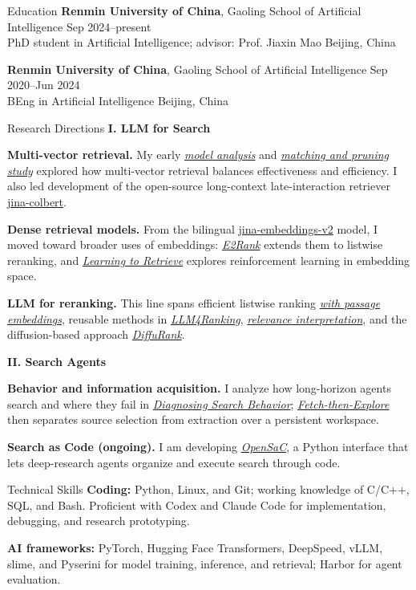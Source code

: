 \documentclass{resume}
\newcommand{\workref}[2]{\hyperref[pub:#1]{\emph{#2}}}
\begin{document}
\begin{rSection}{Education}
\textbf{Renmin University of China}, Gaoling School of Artificial Intelligence \hfill Sep 2024--present \\
PhD student in Artificial Intelligence; advisor: Prof. Jiaxin Mao \hfill Beijing, China

\textbf{Renmin University of China}, Gaoling School of Artificial Intelligence \hfill Sep 2020--Jun 2024 \\
BEng in Artificial Intelligence \hfill Beijing, China
\end{rSection}

\begin{rSection}{Research Directions}
\textbf{I. LLM for Search}

\textbf{Multi-vector retrieval.} My early \workref{p08}{model analysis} and \workref{p07}{matching and pruning study} explored how multi-vector retrieval balances effectiveness and efficiency. I also led development of the open-source long-context late-interaction retriever \href{https://huggingface.co/jinaai/jina-colbert-v1-en}{jina-colbert}.

\textbf{Dense retrieval models.} From the bilingual \href{https://huggingface.co/jinaai/jina-embeddings-v2-base-zh}{jina-embeddings-v2} model, I moved toward broader uses of embeddings: \workref{p03}{E2Rank} extends them to listwise reranking, and \workref{p01}{Learning to Retrieve} explores reinforcement learning in embedding space.

\textbf{LLM for reranking.} This line spans efficient listwise ranking \workref{p06}{with passage embeddings}, reusable methods in \workref{p05}{LLM4Ranking}, \workref{p04}{relevance interpretation}, and the diffusion-based approach \workref{p02}{DiffuRank}.

\medskip
\textbf{II. Search Agents}

\textbf{Behavior and information acquisition.} I analyze how long-horizon agents search and where they fail in \workref{p11}{Diagnosing Search Behavior}; \workref{p10}{Fetch-then-Explore} then separates source selection from extraction over a persistent workspace.

\textbf{Search as Code (ongoing).} I am developing \workref{p09}{OpenSaC}, a Python interface that lets deep-research agents organize and execute search through code.
\end{rSection}

\begin{rSection}{Technical Skills}
\textbf{Coding:} Python, Linux, and Git; working knowledge of C/C++, SQL, and Bash. Proficient with Codex and Claude Code for implementation, debugging, and research prototyping.

\textbf{AI frameworks:} PyTorch, Hugging Face Transformers, DeepSpeed, vLLM, slime, and Pyserini for model training, inference, and retrieval; Harbor for agent evaluation.
\end{rSection}
\end{document}
